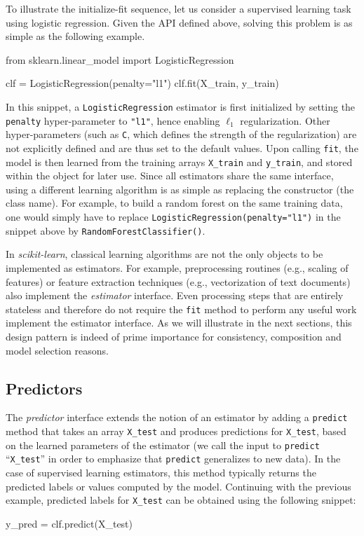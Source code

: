 \documentclass{llncs}
\newcommand{\sklearn}{\textit{scikit-learn}\xspace}
\begin{document}
To illustrate the initialize-fit sequence,
let us consider a supervised learning task using logistic regression.
Given the API defined above, solving this problem is as simple as the following
example.
\begin{pythoncode}
from sklearn.linear_model import LogisticRegression

clf = LogisticRegression(penalty="l1")
clf.fit(X_train, y_train)
\end{pythoncode}
In this snippet, a \texttt{LogisticRegression} estimator is first initialized by
setting the \texttt{penalty} hyper-parameter to \texttt{"l1"}, hence enabling
$\ell_1$ regularization. Other hyper-parameters (such as \texttt{C}, which
defines the strength of the regularization) are not explicitly defined and are
thus set to the default values. Upon calling \texttt{fit}, the model is then
learned from the training arrays \texttt{X\_train} and \texttt{y\_train},
and stored within the object for later use.
Since all estimators share the same interface, using a different learning algorithm is
as simple as replacing the constructor (the class name).
For example, to build a random forest on
the same training data, one would simply have to replace
\texttt{LogisticRegression(penalty="l1")} in the snippet above by
\texttt{RandomForestClassifier()}.

In \sklearn, classical learning algorithms are not the only objects to be
implemented as estimators. For example, preprocessing routines (e.g., scaling of
features) or feature extraction techniques (e.g., vectorization of text
documents) also implement the \textit{estimator} interface. Even processing steps that are
entirely stateless and therefore do not require the \texttt{fit} method to
perform any useful work implement the estimator interface. As we will illustrate
in the next sections, this design pattern is indeed of prime importance for
consistency, composition and model selection reasons.

\subsection{Predictors}

The \textit{predictor} interface extends the notion of an estimator
by adding a \texttt{predict}
method that takes an array \texttt{X\_test} and produces
predictions for \texttt{X\_test}, based on the learned parameters of the
estimator (we call the input to \texttt{predict} ``\texttt{X\_test}'' in order
to emphasize that \texttt{predict} generalizes to new data). In the case of
supervised learning estimators, this method typically returns the predicted
labels or values computed by the model.  Continuing with the previous example,
predicted labels for \texttt{X\_test} can be obtained using the following
snippet:
\begin{pythoncode}
y_pred = clf.predict(X_test)
\end{pythoncode}
\end{document}
